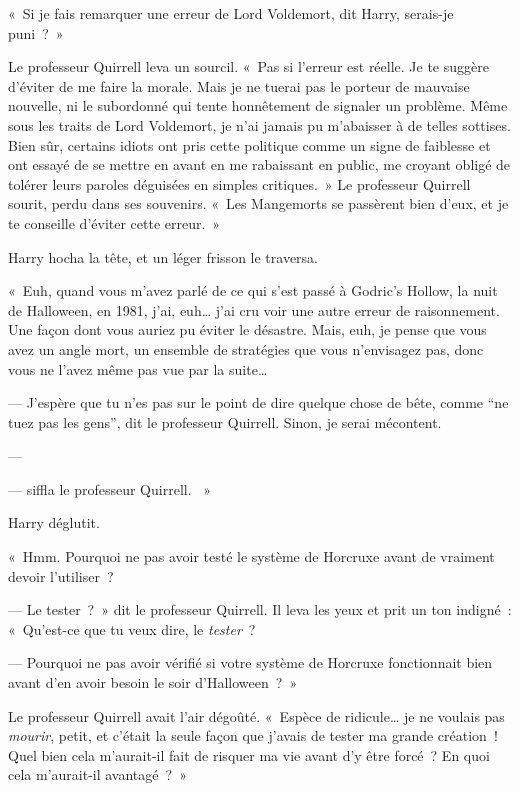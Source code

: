 «~Si je fais remarquer une erreur de Lord Voldemort, dit Harry, serais-je puni~?~»

Le professeur Quirrell leva un sourcil.
«~Pas si l'erreur est réelle.
Je te suggère d'éviter de me faire la morale.
Mais je ne tuerai pas le porteur de mauvaise nouvelle, ni le subordonné qui tente honnêtement de signaler un problème.
Même sous les traits de Lord Voldemort, je n'ai jamais pu m'abaisser à de telles sottises.
Bien sûr, certains idiots ont pris cette politique comme un signe de faiblesse et ont essayé de se mettre en avant en me rabaissant en public, me croyant obligé de tolérer leurs paroles déguisées en simples critiques.~»
Le professeur Quirrell sourit, perdu dans ses souvenirs.
«~Les Mangemorts se passèrent bien d'eux, et je te conseille d'éviter cette erreur.~»

Harry hocha la tête, et un léger frisson le traversa.

«~Euh, quand vous m'avez parlé de ce qui s'est passé à Godric's Hollow, la nuit de Halloween, en 1981, j'ai, euh… j'ai cru voir une autre erreur de raisonnement.
Une façon dont vous auriez pu éviter le désastre.
Mais, euh, je pense que vous avez un angle mort, un ensemble de stratégies que vous n'envisagez pas, donc vous ne l'avez même pas vue par la suite…

--- J'espère que tu n'es pas sur le point de dire quelque chose de bête, comme “ne tuez pas les gens”, dit le professeur Quirrell.
Sinon, je serai mécontent.

--- 

---  siffla le professeur Quirrell.
~»

Harry déglutit.

«~Hmm. Pourquoi ne pas avoir testé le système de Horcruxe avant de vraiment devoir l'utiliser~?

--- Le tester~?~»
dit le professeur Quirrell.
Il leva les yeux et prit un ton indigné~: «~Qu'est-ce que tu veux dire, le \emph{tester}~?

--- Pourquoi ne pas avoir vérifié si votre système de Horcruxe fonctionnait bien avant d'en avoir besoin le soir d'Halloween~?~»

Le professeur Quirrell avait l'air dégoûté.
«~Espèce de ridicule… je ne voulais pas \emph{mourir}, petit, et c'était la seule façon que j'avais de tester ma grande création~!
Quel bien cela m'aurait-il fait de risquer ma vie avant d'y être forcé~?
En quoi cela m'aurait-il avantagé~?~»

